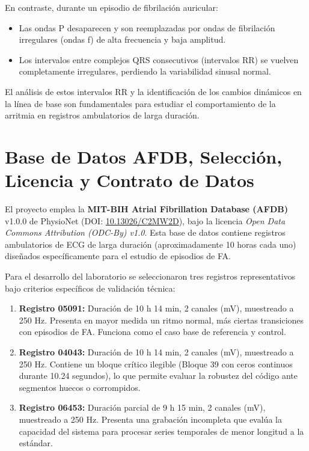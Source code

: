 \documentclass[11pt,a4paper]{article}
\begin{document}
En contraste, durante un episodio de fibrilación auricular:
\begin{itemize}
    \item Las ondas P desaparecen y son reemplazadas por ondas de fibrilación irregulares (ondas f) de alta frecuencia y baja amplitud.
    \item Los intervalos entre complejos QRS consecutivos (intervalos RR) se vuelven completamente irregulares, perdiendo la variabilidad sinusal normal.
\end{itemize}
El análisis de estos intervalos RR y la identificación de los cambios dinámicos en la línea de base son fundamentales para estudiar el comportamiento de la arritmia en registros ambulatorios de larga duración.

\section{Base de Datos AFDB, Selección, Licencia y Contrato de Datos}
El proyecto emplea la \textbf{MIT-BIH Atrial Fibrillation Database (AFDB)} v1.0.0 de PhysioNet (DOI: \href{https://doi.org/10.13026/C2MW2D}{10.13026/C2MW2D}), bajo la licencia \textit{Open Data Commons Attribution (ODC-By) v1.0}. Esta base de datos contiene registros ambulatorios de ECG de larga duración (aproximadamente 10 horas cada uno) diseñados específicamente para el estudio de episodios de FA.

Para el desarrollo del laboratorio se seleccionaron tres registros representativos bajo criterios específicos de validación técnica:
\begin{enumerate}
    \item \textbf{Registro 05091:} Duración de 10 h 14 min, 2 canales (mV), muestreado a 250 Hz. Presenta en mayor medida un ritmo normal, más ciertas transiciones con episodios de FA. Funciona como el caso base de referencia y control.
    \item \textbf{Registro 04043:} Duración de 10 h 14 min, 2 canales (mV), muestreado a 250 Hz. Contiene un bloque crítico ilegible (Bloque 39 con ceros continuos durante 10.24 segundos), lo que permite evaluar la robustez del código ante segmentos huecos o corrompidos.
    \item \textbf{Registro 06453:} Duración parcial de 9 h 15 min, 2 canales (mV), muestreado a 250 Hz. Presenta una grabación incompleta que evalúa la capacidad del sistema para procesar series temporales de menor longitud a la estándar.
\end{enumerate}
\end{document}
